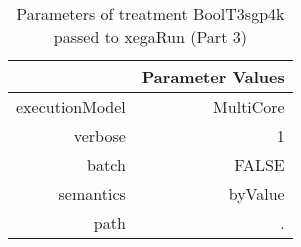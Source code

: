 \begin{table}[ht]
\centering
\begin{tabular}{rr}
  \hline
 & Parameter Values \\ 
  \hline
executionModel & MultiCore \\ 
  verbose & 1 \\ 
  batch & FALSE \\ 
  semantics & byValue \\ 
  path & . \\ 
   \hline
\end{tabular}
\caption{ Parameters of treatment BoolT3sgp4k passed to xegaRun
 (Part 3)} 
\end{table}
